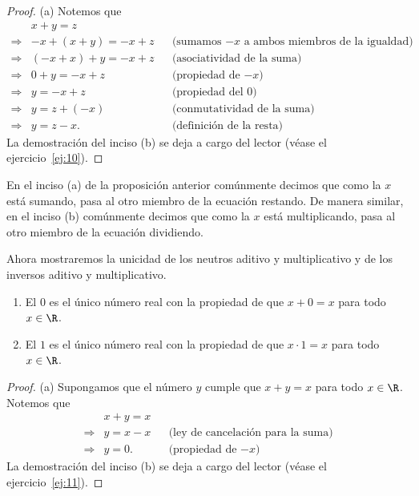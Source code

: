 \documentclass[12pt,a4paper]{book}
\begin{document}
    \begin{proof}
        (a) Notemos que
        \begin{align*}
            &x+y=z\\
            \Rightarrow{}& -x+(x+y)=-x+z &&\text{(sumamos $-x$ a ambos miembros de la igualdad)}\\
            \Rightarrow{}& (-x+x)+y=-x+z &&\text{(asociatividad de la suma)}\\
            \Rightarrow{}& 0+y=-x+z &&\text{(propiedad de $-x$)}\\
            \Rightarrow{}& y=-x+z &&\text{(propiedad del $0$)}\\
            \Rightarrow{}& y=z+(-x) &&\text{(conmutatividad de la suma)}\\
            \Rightarrow{}& y=z-x. &&\text{(definición de la resta)}
        \end{align*}
        La demostración del inciso (b) se deja a cargo del lector (véase el ejercicio~\ref{ej:10}).
    \end{proof}

    En el inciso (a) de la proposición anterior comúnmente decimos que como la $x$ está
    sumando, pasa al otro miembro de la ecuación restando. De
    manera similar, en el inciso (b) comúnmente decimos que como la $x$ está
    multiplicando, pasa al otro miembro de la ecuación dividiendo.

    Ahora mostraremos la unicidad de los neutros aditivo y multiplicativo y
    de los inversos aditivo y multiplicativo.

    \begin{proposicion}\label{prop:5}
        \begin{enumerate}
            \item El $0$ es el único número real con la propiedad de que $x+0=x$ para todo
            $x\in\R$.
            \item El $1$ es el único número real con la propiedad de que $x\cdot 1=x$ para todo
            $x\in\R$.
        \end{enumerate}
    \end{proposicion}

    \begin{proof}
        (a) Supongamos que el número $y$ cumple que $x+y=x$ para
        todo $x\in\R$. Notemos que
        \begin{align*}
            &x+y=x\\
            \Rightarrow{}& y=x-x &&\text{(ley de cancelación para la suma)}\\
            \Rightarrow{}& y=0. &&\text{(propiedad de $-x$)}
        \end{align*}
        La demostración del inciso (b) se deja a cargo del lector (véase el ejercicio~\ref{ej:11}).
    \end{proof}
\end{document}
